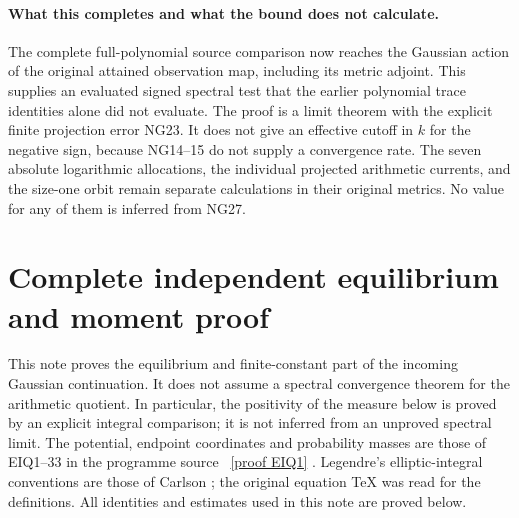 \documentclass[11pt]{article}
\begin{document}
\paragraph{What this completes and what the bound does not calculate.}
The complete full-polynomial source comparison now reaches the Gaussian
action of the original attained observation map, including its metric
adjoint. This supplies an evaluated signed spectral test that the earlier
polynomial trace identities alone did not evaluate. The proof is a limit
theorem with the explicit finite projection error NG23. It does not give
an effective cutoff in $k$ for the negative sign, because NG14--15 do not
supply a convergence rate. The seven absolute logarithmic allocations,
the individual projected arithmetic currents, and the size-one orbit
remain separate calculations in their original metrics. No value for
any of them is inferred from NG27.



\clearpage
\section*{Complete independent equilibrium and moment proof}

This note proves the equilibrium and finite-constant part of the incoming
Gaussian continuation. It does not assume a spectral convergence theorem
for the arithmetic quotient. In particular, the positivity of the measure
below is proved by an explicit integral comparison; it is not inferred
from an unproved spectral limit. The potential, endpoint coordinates and
probability masses are those of EIQ1--33 in the programme source
\cite{EIQ}%
~\href{https://github.com/KokunoYumeto/zeta-function-research-reader/blob/5992ad50c0f2a06921f1fcaded7b4e38097c0739/workbenches/splitzero-tandem/continuations/20260920-original-kernel-mixed-determinants/cumulative/09_UPDATED_JOINT_NOTE.tex\#L4386}{[proof EIQ1]}%
{}. Legendre's elliptic-integral conventions are those of Carlson
\cite{Carlson}; the original equation TeX was read for the definitions.
All identities and estimates used in this note are proved below.
\end{document}
